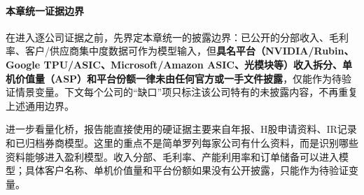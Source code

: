 \paragraph{本章统一证据边界} 在进入逐公司证据之前，先界定本章统一的披露边界：已公开的分部收入、毛利率、客户/供应商集中度数据可作为模型输入，但\textbf{具名平台（NVIDIA/Rubin、Google TPU/ASIC、Microsoft/Amazon ASIC、光模块等）收入拆分、单机价值量（ASP）和平台份额一律未由任何官方或一手文件披露}，仅能作为待验证情景变量。下文每个公司的``缺口''项只标注该公司特有的未披露内容，不再重复上述通用边界。

进一步看量化桥，报告能直接使用的硬证据主要来自年报、H股申请资料、IR记录和已归档券商模型。这里的重点不是简单罗列每家公司有什么资料，而是识别哪些资料能够进入盈利模型。收入分部、毛利率、产能利用率和订单储备可以进入模型；具体客户名称、单机价值量和平台份额如果没有公开披露，只能作为待验证变量。

